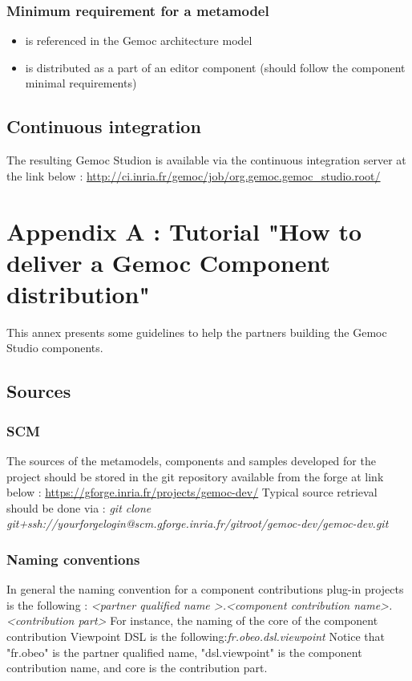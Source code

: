 \documentclass{gemoc} %
\begin{document}
\subsection{Minimum requirement for a metamodel}
\begin{itemize}
	\item is referenced in the Gemoc architecture model
	\item is distributed as a part of an editor component (should follow the component minimal requirements)
\end{itemize}
\section{Continuous integration}
The resulting Gemoc Studion is available via the continuous integration server at the link below :
\newline
\url {http://ci.inria.fr/gemoc/job/org.gemoc.gemoc_studio.root/}


\newpage
\chapter{Appendix A : Tutorial "How to deliver a Gemoc Component distribution"}
This annex presents some guidelines to help the partners building the Gemoc Studio components.
\section{Sources}
\subsection{SCM}
The sources of the metamodels, components and samples developed for the project should be stored in the git repository available from the forge at link below :\newline
\url{https://gforge.inria.fr/projects/gemoc-dev/}
\newline\newline
Typical source retrieval should be done via :\newline
\textit{git clone git+ssh://yourforgelogin@scm.gforge.inria.fr/gitroot/gemoc-dev/gemoc-dev.git}
\subsection{Naming conventions}
In general the naming convention for a component contributions plug-in projects is the following :
\newline
\textit{\textless partner qualified name \textgreater.\textless component contribution name\textgreater .\textless contribution part\textgreater }
\newline\newline
For instance, the naming of the core of the component contribution Viewpoint DSL is the following:\textit{fr.obeo.dsl.viewpoint}
\newline
Notice that "fr.obeo" is the partner qualified name, "dsl.viewpoint" is the component contribution name, and core is the contribution part.
\newline
\end{document}
